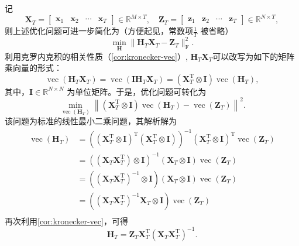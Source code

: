 记
\[
    \mathbf{X}_T = \begin{bmatrix} \bm{x}_1 & \bm{x}_2 & \cdots & \bm{x}_T \end{bmatrix} \in \mathbb{R}^{M \times T},
    \quad
    \mathbf{Z}_T = \begin{bmatrix} \bm{z}_1 & \bm{z}_2 & \cdots & \bm{z}_T \end{bmatrix} \in \mathbb{R}^{N \times T},
\]
则上述优化问题可进一步简化为（方便起见，常数项\( \frac{1}{T} \) 被省略）
\[
    \min_{\mathbf{H}} \big\| \mathbf{H}_T \mathbf{X}_T - \mathbf{Z}_T \big\|_{\mathrm{F}}^2.
\]
利用克罗内克积的相关性质（\cref{cor:kronecker-vec}）, \( \mathbf{H}_T \mathbf{X}_T \)可以改写为如下的矩阵乘向量的形式：
\[
    \operatorname{vec}(\mathbf{H}_T \mathbf{X}_T) = \operatorname{vec}(\mathbf{I} \mathbf{H}_T \mathbf{X}_T)  = (\mathbf{X}_T^{\mathrm{T}} \otimes \mathbf{I}) \operatorname{vec}(\mathbf{H}_T),
\]
其中，\( \mathbf{I} \in \mathbb{R}^{N \times N} \) 为单位矩阵。于是，优化问题可转化为
\[
    \min_{\operatorname{vec}(\mathbf{H}_T)} \left\| (\mathbf{X}_T^{\mathrm{T}} \otimes \mathbf{I}) \operatorname{vec}(\mathbf{H}_T) - \operatorname{vec}(\mathbf{Z}_T) \right\|^2.
\]
该问题为标准的线性最小二乘问题，其解析解为
\[
    \begin{split}
        \operatorname{vec}(\mathbf{H}_T) & = \left( (\mathbf{X}_T^{\mathrm{T}} \otimes \mathbf{I})^{\mathrm{T}} (\mathbf{X}_T^{\mathrm{T}} \otimes \mathbf{I}) \right)^{-1} (\mathbf{X}_T^{\mathrm{T}} \otimes \mathbf{I})^{\mathrm{T}} \operatorname{vec}(\mathbf{Z}_T ) \\
                                         & = \left( \left( \mathbf{X}_T \mathbf{X}_T^{\mathrm{T}} \right)\otimes \mathbf{I} \right)^{-1} (\mathbf{X}_T \otimes \mathbf{I}) \operatorname{vec}(\mathbf{Z}_T)                                                               \\
                                         & = \left( \left( \mathbf{X}_T \mathbf{X}_T^{\mathrm{T}} \right)^{-1} \otimes \mathbf{I} \right) (\mathbf{X}_T \otimes \mathbf{I}) \operatorname{vec}(\mathbf{Z}_T)                                                              \\
                                         & = \left( \left( \mathbf{X}_T \mathbf{X}_T^{\mathrm{T}} \right)^{-1} \mathbf{X}_T \otimes \mathbf{I} \right) \operatorname{vec}(\mathbf{Z}_T)                                                                                   \\
    \end{split}
\]
再次利用\cref{cor:kronecker-vec}，可得
\[
    \mathbf{H}_T = \mathbf{Z}_T \mathbf{X}_T^{\mathrm{T}} \left( \mathbf{X}_T \mathbf{X}_T^{\mathrm{T}} \right)^{-1}.
\]

